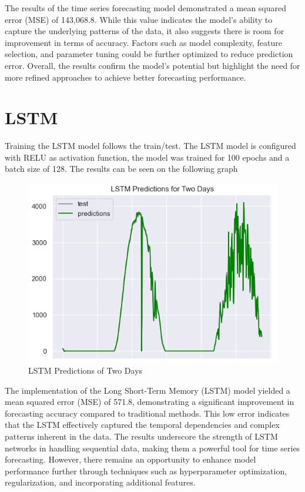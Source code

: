 \documentclass[a4paper,12pt]{article}
\begin{document}
The results of the time series forecasting model demonstrated a mean squared error (MSE) of 143,068.8. While this value indicates the model's ability to capture the underlying patterns of the data, it also suggests there is room for improvement in terms of accuracy. Factors such as model complexity, feature selection, and parameter tuning could be further optimized to reduce prediction error. Overall, the results confirm the model's potential but highlight the need for more refined approaches to achieve better forecasting performance.

\section{LSTM}
Training the LSTM model follows the train/test. The LSTM model is configured with RELU as activation function, the model was trained for 100 epochs and a batch size of 128. The results can be seen on the following graph

\begin{figure}[H] %
    \centering %
    \includegraphics[height=0.35\textwidth]{LSTM.png} %
    \caption{LSTM Predictions of Two Days} %
    \label{fig:etiqueta_imagen} %
\end{figure} 

The implementation of the Long Short-Term Memory (LSTM) model yielded a mean squared error (MSE) of 571.8, demonstrating a significant improvement in forecasting accuracy compared to traditional methods. This low error indicates that the LSTM effectively captured the temporal dependencies and complex patterns inherent in the data. The results underscore the strength of LSTM networks in handling sequential data, making them a powerful tool for time series forecasting. However, there remains an opportunity to enhance model performance further through techniques such as hyperparameter optimization, regularization, and incorporating additional features.
\end{document}
